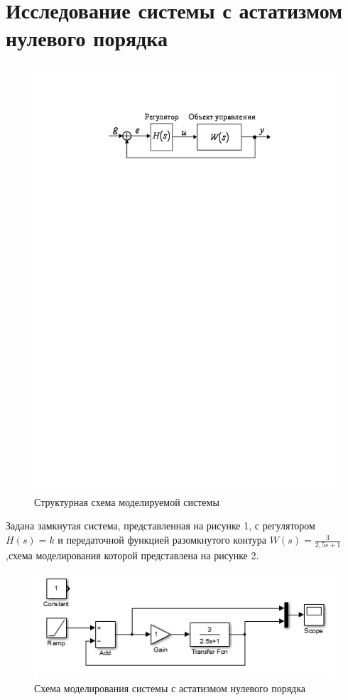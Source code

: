 \documentclass[a4paper, 11pt, russian]{article}
\begin{document}
    \section{Исследование системы с астатизмом нулевого порядка}
    \begin{figure}[ht!]
        \centering
        \includegraphics{0ast}
        \caption{Структурная схема моделируемой системы}
    \end{figure}
    Задана замкнутая система, представленная на рисунке 1, с регулятором $H(s) = k$ и передаточной функцией разомкнутого контура $W(s)=\displaystyle{\frac{3}{2,5s + 1}}$,схема моделирования которой представлена на рисунке 2.
    
    \begin{figure}[h!]
        \centering
        \includegraphics{0astScheme.PNG}
        \caption{Схема моделирования системы с астатизмом нулевого порядка}
    \end{figure}
\end{document}
